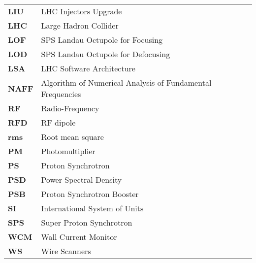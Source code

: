 \begin{flushleft}
  \begin{tabular}{l l}
  
\textbf{LIU} & \qquad\qquad\qquad LHC Injectors Upgrade \\
\textbf{LHC} & \qquad\qquad\qquad Large Hadron Collider \\

\textbf{LOF} & \qquad\qquad\qquad SPS Landau Octupole for Focusing \\
\textbf{LOD} & \qquad\qquad\qquad SPS Landau Octupole for Defocusing \\

\textbf{LSA} & \qquad\qquad\qquad LHC Software Architecture \\


\textbf{NAFF} & \qquad\qquad\qquad Algorithm of Numerical Analysis of Fundamental Frequencies \\

\textbf{RF} & \qquad\qquad\qquad Radio-Frequency \\
\textbf{RFD} & \qquad\qquad\qquad RF dipole \\
\textbf{rms} & \qquad\qquad\qquad Root mean square \\

\textbf{PM} & \qquad\qquad\qquad Photomultiplier \\
\textbf{PS} & \qquad\qquad\qquad Proton Synchrotron \\
\textbf{PSD} & \qquad\qquad\qquad Power Spectral Density \\
\textbf{PSB} & \qquad\qquad\qquad Proton Synchrotron Booster \\

\textbf{SI} & \qquad\qquad\qquad International System of Units \\
\textbf{SPS} & \qquad\qquad\qquad Super Proton Synchrotron \\


\textbf{WCM} & \qquad\qquad\qquad Wall Current Monitor \\
\textbf{WS} & \qquad\qquad\qquad Wire Scanners \\



\end{tabular}
\end{flushleft}



